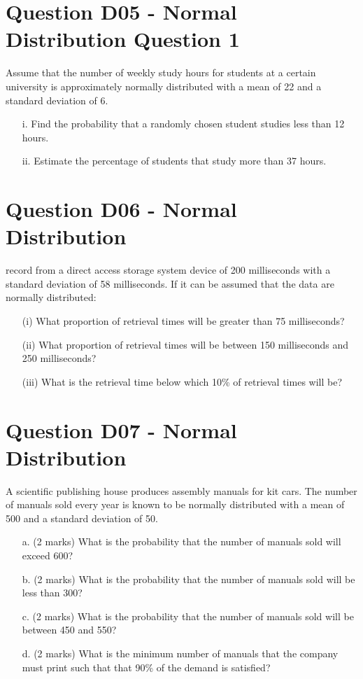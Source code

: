 \documentclass[]{report}
\begin{document}
	
\section{Question D05 - Normal Distribution Question 1}
Assume that the number of weekly study hours for students at a certain university is approximately normally distributed with a mean of 22 and a standard deviation of 6.

\begin{itemize}
	\item[i.] Find the probability that a randomly chosen student studies less than 12 hours.
	\item[ii.] Estimate the percentage of students that study more than 37 hours.
\end{itemize}

\section{Question D06 - Normal Distribution } %
record from a direct access storage system device of 200 milliseconds
with a standard deviation of 58 milliseconds. If it can be assumed that
the data are normally distributed:

\begin{itemize}
	\item[(i)] What proportion of retrieval times will be greater than 75
	milliseconds?
	\item[(ii)] What proportion of retrieval times will be between 150
	milliseconds and 250 milliseconds?
	\item[(iii)] What is the retrieval time below which 10\% of retrieval times
	will be?
\end{itemize}

\section{Question D07 - Normal Distribution } %

A scientific publishing house produces assembly manuals for kit cars. The number
of manuals sold every year is known to be normally distributed with a mean of 500 and a
standard deviation of 50.

\begin{itemize}
	\item[a.](2 marks) What is the probability that the number of manuals sold will exceed 600?
	\item[b.](2 marks) What is the probability that the number of manuals sold will be less than 300?
	\item[c.](2 marks)  What is the probability that the number of manuals sold will be between 450 and 550?
	\item[d.](2 marks)  What is the minimum number of manuals that the company must print such
	that that 90\% of the demand is satisfied?
\end{itemize}
\end{document}
